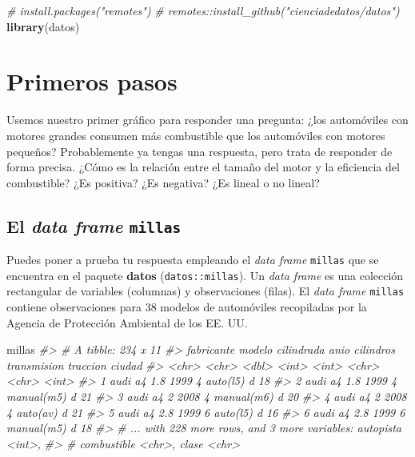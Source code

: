 \documentclass[11pt,oneside]{report}
\newenvironment{Shaded}{\begin{snugshade}}{\end{snugshade}}
\newcommand{\CommentTok}[1]{\textcolor[rgb]{0.56,0.35,0.01}{\textit{#1}}}
\newcommand{\KeywordTok}[1]{\textcolor[rgb]{0.13,0.29,0.53}{\textbf{#1}}}
\newcommand{\NormalTok}[1]{#1}
\begin{document}
\begin{Shaded}
\begin{Highlighting}[]
\CommentTok{# install.packages("remotes")}
\CommentTok{# remotes::install_github("cienciadedatos/datos")}
\KeywordTok{library}\NormalTok{(datos)}
\end{Highlighting}
\end{Shaded}

\hypertarget{primeros-pasos}{%
\section{Primeros pasos}\label{primeros-pasos}}

Usemos nuestro primer gráfico para responder una pregunta: ¿los
automóviles con motores grandes consumen más combustible que los
automóviles con motores pequeños? Probablemente ya tengas una respuesta,
pero trata de responder de forma precisa. ¿Cómo es la relación entre el
tamaño del motor y la eficiencia del combustible? ¿Es positiva? ¿Es
negativa? ¿Es lineal o no lineal?

\hypertarget{el-data-frame-millas}{%
\subsection{\texorpdfstring{El \emph{data frame}
\texttt{millas}}{El data frame millas}}\label{el-data-frame-millas}}

Puedes poner a prueba tu respuesta empleando el \emph{data frame}
\texttt{millas} que se encuentra en el paquete \textbf{datos}
(\texttt{datos::millas}). Un \emph{data frame} es una colección
rectangular de variables (columnas) y observaciones (filas). El
\emph{data frame} \texttt{millas} contiene observaciones para 38 modelos
de automóviles recopiladas por la Agencia de Protección Ambiental de los
EE. UU.

\begin{Shaded}
\begin{Highlighting}[]
\NormalTok{millas}
\CommentTok{#> # A tibble: 234 x 11}
\CommentTok{#>   fabricante modelo cilindrada  anio cilindros transmision traccion ciudad}
\CommentTok{#>   <chr>      <chr>       <dbl> <int>     <int> <chr>       <chr>     <int>}
\CommentTok{#> 1 audi       a4            1.8  1999         4 auto(l5)    d            18}
\CommentTok{#> 2 audi       a4            1.8  1999         4 manual(m5)  d            21}
\CommentTok{#> 3 audi       a4            2    2008         4 manual(m6)  d            20}
\CommentTok{#> 4 audi       a4            2    2008         4 auto(av)    d            21}
\CommentTok{#> 5 audi       a4            2.8  1999         6 auto(l5)    d            16}
\CommentTok{#> 6 audi       a4            2.8  1999         6 manual(m5)  d            18}
\CommentTok{#> # ... with 228 more rows, and 3 more variables: autopista <int>,}
\CommentTok{#> #   combustible <chr>, clase <chr>}
\end{Highlighting}
\end{Shaded}
\end{document}
